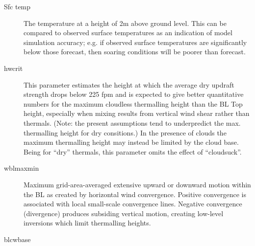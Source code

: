 \documentclass[a4paper,12pt]{refrep}
\begin{document}
\begin{description}
\item[Sfc temp] 
The temperature at a height of 2m above ground level.  This can be
compared to observed surface temperatures as an indication of model
simulation accuracy; e.g. if observed surface temperatures are
significantly below those forecast, then soaring conditions will be
poorer than forecast.
\item[hwcrit]  
This parameter estimates the height at which the average dry updraft
strength drops below 225 fpm and is expected to give better
quantitative numbers for the maximum cloudless thermalling height than
the BL Top height, especially when mixing results from vertical wind
shear rather than thermals.  (Note: the present assumptions tend to
underpredict the max. thermalling height for dry consitions.) In the
presence of clouds the maximum thermalling height may instead be
limited by the cloud base.  Being for ``dry'' thermals, this parameter
omits the effect of ``cloudsuck''.
\item[wblmaxmin]  
Maximum grid-area-averaged extensive upward or downward motion within
the BL as created by horizontal wind convergence. Positive convergence
is associated with local small-scale convergence lines.  Negative
convergence (divergence) produces subsiding vertical motion, creating
low-level inversions which limit thermalling heights.
\item[blcwbase]   
\end{description}
\end{document}
